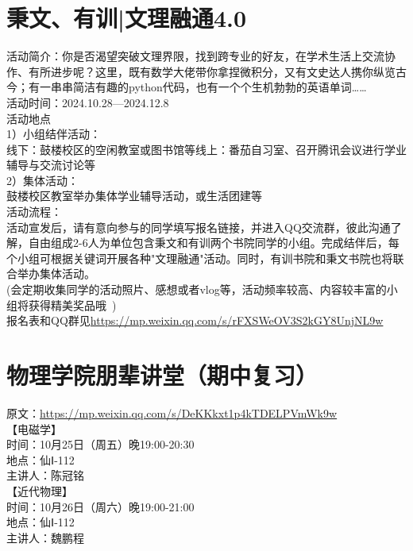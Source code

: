 \documentclass[letterpaper, 12pt]{article}
\begin{document}
\begin{multicols}{2}
\section{秉文、有训|文理融通4.0}
活动简介：你是否渴望突破文理界限，找到跨专业的好友，在学术生活上交流协作、有所进步呢？这里，既有数学大佬带你拿捏微积分，又有文史达人携你纵览古今；有一串串简洁有趣的python代码，也有一个个生机勃勃的英语单词……\\
活动时间：2024.10.28—2024.12.8\\
活动地点\\
1）小组结伴活动：\\
 线下：鼓楼校区的空闲教室或图书馆等线上：番茄自习室、召开腾讯会议进行学业辅导与交流讨论等\\
2）集体活动：\\
鼓楼校区教室举办集体学业辅导活动，或生活团建等\\
活动流程：\\
活动宣发后，请有意向参与的同学填写报名链接，并进入QQ交流群，彼此沟通了解，自由组成2-6人为单位包含秉文和有训两个书院同学的小组。完成结伴后，每个小组可根据关键词开展各种"文理融通"活动。同时，有训书院和秉文书院也将联合举办集体活动。\\
(会定期收集同学的活动照片、感想或者vlog等，活动频率较高、内容较丰富的小组将获得精美奖品哦~)\\
报名表和QQ群见\url{https://mp.weixin.qq.com/s/rFXSWeOV3S2kGY8UnjNL9w}

\section{物理学院朋辈讲堂（期中复习）}
原文：\url{https://mp.weixin.qq.com/s/DeKKkxt1p4kTDELPVmWk9w}\\
【电磁学】\\
时间：10月25日（周五）晚19:00-20:30\\
地点：仙Ⅰ-112\\
主讲人：陈冠铭\\
【近代物理】\\
时间：10月26日（周六）晚19:00-21:00\\
地点：仙Ⅰ-112\\
主讲人：魏鹏程\\


\end{multicols} 
\end{document}

